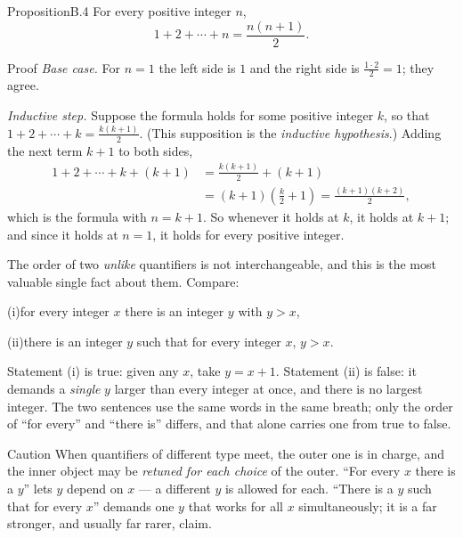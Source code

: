 \documentclass[a4paper,12pt,oneside]{memoir}
\begin{document}
\begin{envproposition}{Proposition}{B.4}{}
For every positive integer \(n\),
\[ 1 + 2 + \cdots + n = \frac{n(n + 1)}{2}. \]
\end{envproposition}

\begin{envproof}{Proof}{}{}
\emph{Base case.} For \(n = 1\) the left side is \(1\) and the right side is \(\frac{1 \cdot 2}{2} = 1\); they agree.

\emph{Inductive step.} Suppose the formula holds for some positive integer \(k\), so that \(1 + 2 + \cdots + k = \frac{k(k + 1)}{2}\). (This supposition is the \emph{inductive hypothesis}.) Adding the next term \(k + 1\) to both sides,
\[ \begin{aligned} 1 + 2 + \cdots + k + (k + 1) &= \frac{k(k + 1)}{2} + (k + 1) \\ &= (k + 1)\!\left(\frac{k}{2} + 1\right) = \frac{(k + 1)(k + 2)}{2}, \end{aligned} \]
which is the formula with \(n = k + 1\). So whenever it holds at \(k\), it holds at \(k + 1\); and since it holds at \(n = 1\), it holds for every positive integer. \qedmark
\end{envproof}


The order of two \emph{unlike} quantifiers is not interchangeable, and this is the most valuable single fact about them. Compare:

\begin{centerstatement}
(i)\enspace\enspace for every integer \(x\) there is an integer \(y\) with \(y > x\),
\end{centerstatement}
\begin{centerstatement}
(ii)\enspace\enspace there is an integer \(y\) such that for every integer \(x\), \(y > x\).
\end{centerstatement}

Statement (i) is true: given any \(x\), take \(y = x + 1\). Statement (ii) is false: it demands a \emph{single} \(y\) larger than every integer at once, and there is no largest integer. The two sentences use the same words in the same breath; only the order of “for every” and “there is” differs, and that alone carries one from true to false.

\begin{envcaution}{Caution}{}{}
When quantifiers of different type meet, the outer one is in charge, and the inner object may be \emph{retuned for each choice} of the outer. “For every \(x\) there is a \(y\)” lets \(y\) depend on \(x\) — a different \(y\) is allowed for each. “There is a \(y\) such that for every \(x\)” demands one \(y\) that works for all \(x\) simultaneously; it is a far stronger, and usually far rarer, claim.
\end{envcaution}
\end{document}

